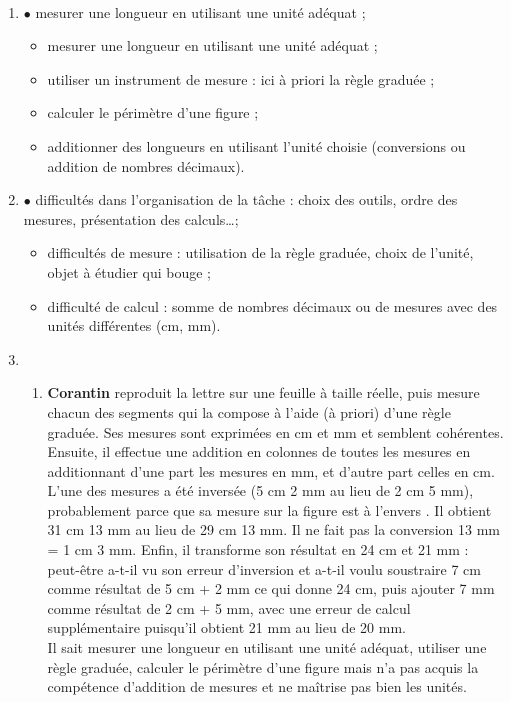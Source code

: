 \ \\ [-5mm]
\begin{enumerate}
   \item \textcolor{A1}{$\bullet$} mesurer une longueur en utilisant une unité adéquat ;
   \begin{itemize}
      \item mesurer une longueur en utilisant une unité adéquat ;
      \item utiliser un instrument de mesure : ici à priori la règle graduée ;
      \item calculer le périmètre d'une figure ;
      \item additionner des longueurs en utilisant l'unité choisie (conversions ou addition de nombres décimaux).
   \end{itemize}
   \item \textcolor{A1}{$\bullet$} difficultés dans l'organisation de la tâche : choix des outils, ordre des mesures, présentation des calculs\dots ;
   \begin{itemize}
      \item difficultés de mesure : utilisation de la règle graduée, choix de l'unité, objet à étudier \og qui bouge \fg ;
      \item difficulté de calcul : somme de nombres décimaux ou de mesures avec des unités différentes (cm, mm).
   \end{itemize}
   \item
   \begin{enumerate}
      \item {\bf Corantin} reproduit la lettre sur une feuille à taille réelle, puis mesure chacun des segments qui la compose à l'aide (à priori) d'une règle graduée. Ses mesures sont exprimées en cm et mm et semblent cohérentes. Ensuite, il effectue une addition en colonnes de toutes les mesures en additionnant d'une part les mesures en mm, et d'autre part celles en cm. L'une des mesures a été inversée (5 cm 2 mm au lieu de 2 cm 5 mm), probablement parce que sa mesure sur la figure est \og à l'envers \fg{}. Il obtient 31 cm 13 mm au lieu de 29 cm 13 mm. Il ne fait pas la conversion 13 mm = 1 cm 3 mm. Enfin, il transforme son résultat en 24 cm et 21 mm : peut-être a-t-il vu son erreur d'inversion et a-t-il voulu soustraire 7 cm comme résultat de 5 cm + 2 mm ce qui donne 24 cm, puis ajouter 7 mm comme résultat de 2 cm + 5 mm, avec une erreur de calcul supplémentaire puisqu'il obtient 21 mm au lieu de 20 mm. \\
      Il sait mesurer une longueur en utilisant une unité adéquat, utiliser une règle graduée, calculer le périmètre d'une figure mais n'a pas acquis la compétence d'addition de mesures et ne maîtrise pas bien les unités. \\

\end{enumerate}
\end{enumerate}
